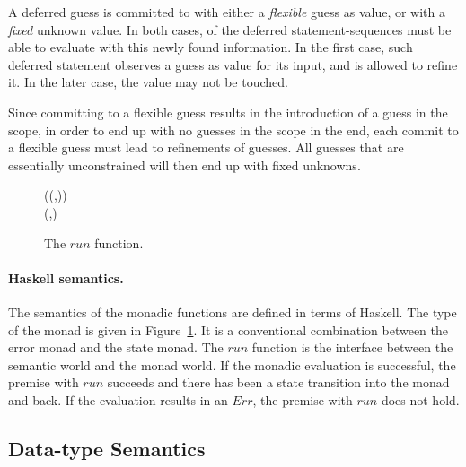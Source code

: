 \documentclass[preprint,natbib]{sigplanconf}
\newcommand{\Conid}[1]{\mathit{#1}}
\newcommand{\Varid}[1]{\mathit{#1}}
\def\resethooks{%
  \global\let\SaveRestoreHook\empty
  \global\let\ColumnHook\empty}
\newcommand\Substitution{\theta}
\newcommand\Scope{\zeta}
\begin{document}
    A deferred guess is committed to with either a {\it flexible} guess as value, or with
    a {\it fixed} unknown value. In both cases, of the deferred statement-sequences must be able to evaluate with this newly found information.
    In the first case, such deferred statement observes a guess as value for its input, and is allowed to refine it. In the later case,
    the value may not be touched.

    Since committing to a flexible guess results in the introduction of a guess in the scope, in order to end up with no guesses in the scope in
    the end, each commit to a flexible guess must lead to refinements of guesses. All guesses that are essentially unconstrained will then end up
    with fixed unknowns.

    \begin{figure}[htp]
    \begin{hscode}\SaveRestoreHook
{}
\>[5]{}\;\Conid{I}\;\alpha\mathrel{=}\Conid{ErrorT}\;\Conid{Err}\;(\Conid{State}\;(\Substitution,\Scope))\;\alpha{}\<[E]
\\
\>[5]{}\Varid{run}\mathbin{::}\Conid{I}\;\alpha\to \Substitution\to \Scope\to (\Substitution,\alpha){}\<[E]
\ColumnHook
\end{hscode}\resethooks
    \caption{The \ensuremath{\Varid{run}} function.}
    \label{fig:run-function}
    \end{figure}

    \paragraph{Haskell semantics.}    
    The semantics of the monadic functions are defined in terms of Haskell. The type of the monad is
    given in Figure~\ref{fig:run-function}. It is a conventional combination between the error monad and
    the state monad. The \ensuremath{\Varid{run}} function is the interface between the semantic world and the monad world.
    If the monadic evaluation is successful, the premise with \ensuremath{\Varid{run}} succeeds and there has been a
    state transition into the monad and back. If the evaluation results in an \ensuremath{\Conid{Err}}, the premise with
    \ensuremath{\Varid{run}} does not hold.

  \subsection{Data-type Semantics}
  
\end{document}

